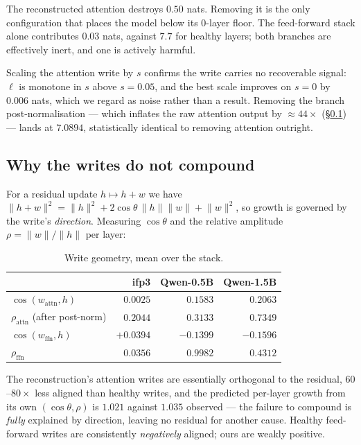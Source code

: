 \begin{finding}
The reconstructed attention destroys $0.50$ nats. Removing it is the only configuration that
places the model below its $0$-layer floor. The feed-forward stack alone contributes $0.03$ nats,
against $7.7$ for healthy layers; both branches are effectively inert, and one is actively
harmful.
\end{finding}

Scaling the attention write by $s$ confirms the write carries no recoverable signal: $\ell$ is
monotone in $s$ above $s=0.05$, and the best scale improves on $s=0$ by $0.006$ nats, which we
regard as noise rather than a result. Removing the branch post-normalisation --- which inflates the
raw attention output by $\approx 44\times$ (\S\ref{sec:gap-amp}) --- lands at $7.0894$, statistically
identical to removing attention outright.

\subsection{Why the writes do not compound}\label{sec:gap-amp}

For a residual update $h \mapsto h + w$ we have
$\lVert h+w\rVert^2 = \lVert h\rVert^2 + 2\cos\theta\,\lVert h\rVert\lVert w\rVert + \lVert w\rVert^2$,
so growth is governed by the write's \emph{direction}. Measuring $\cos\theta$ and the relative
amplitude $\rho = \lVert w\rVert/\lVert h\rVert$ per layer:

\begin{table}[h]
\centering\small
\caption{Write geometry, mean over the stack.}
\begin{tabular}{lrrr}
\toprule
 & ifp3 & Qwen-0.5B & Qwen-1.5B \\
\midrule
$\cos(w_{\mathrm{attn}}, h)$ & $0.0025$ & $0.1583$ & $0.2063$ \\
$\rho_{\mathrm{attn}}$ (after post-norm) & $0.2044$ & $0.3133$ & $0.7349$ \\
$\cos(w_{\mathrm{ffn}}, h)$ & $+0.0394$ & $-0.1399$ & $-0.1596$ \\
$\rho_{\mathrm{ffn}}$ & $0.0356$ & $0.9982$ & $0.4312$ \\
\bottomrule
\end{tabular}
\end{table}

The reconstruction's attention writes are essentially orthogonal to the residual, $60$--$80\times$
less aligned than healthy writes, and the predicted per-layer growth from its own
$(\cos\theta,\rho)$ is $1.021$ against $1.035$ observed --- the failure to compound is
\emph{fully} explained by direction, leaving no residual for another cause. Healthy feed-forward
writes are consistently \emph{negatively} aligned; ours are weakly positive.

